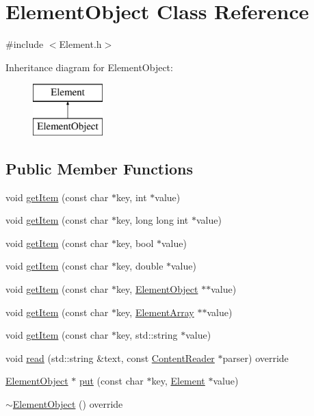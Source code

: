 \hypertarget{classElementObject}{}\section{Element\+Object Class Reference}
\label{classElementObject}


{\ttfamily \#include $<$Element.\+h$>$}

Inheritance diagram for Element\+Object\+:\begin{figure}[H]
\begin{center}
\leavevmode
\includegraphics[height=2.000000cm]{classElementObject}
\end{center}
\end{figure}
\subsection*{Public Member Functions}
\begin{DoxyCompactItemize}
\item 
void \mbox{\hyperlink{classElementObject_a7b3a1ef505e63d87ad39309c5ae1b5b3}{get\+Item}} (const char $\ast$key, int $\ast$value)
\item 
void \mbox{\hyperlink{classElementObject_af0ed1f4a16e995e2f66707d3375f7f39}{get\+Item}} (const char $\ast$key, long long int $\ast$value)
\item 
void \mbox{\hyperlink{classElementObject_a78d2c73282624ffed8607d2b8adc3435}{get\+Item}} (const char $\ast$key, bool $\ast$value)
\item 
void \mbox{\hyperlink{classElementObject_a114eb87b32efc8c71c3b14bfc9d121ce}{get\+Item}} (const char $\ast$key, double $\ast$value)
\item 
void \mbox{\hyperlink{classElementObject_a83b8a7f1230171e12f8f3a12326f32a2}{get\+Item}} (const char $\ast$key, \mbox{\hyperlink{classElementObject}{Element\+Object}} $\ast$$\ast$value)
\item 
void \mbox{\hyperlink{classElementObject_adf210b43e30ae63d08c05eb7a46b8c44}{get\+Item}} (const char $\ast$key, \mbox{\hyperlink{classElementArray}{Element\+Array}} $\ast$$\ast$value)
\item 
void \mbox{\hyperlink{classElementObject_a654bd0874175b07f4efa368f97dd82fa}{get\+Item}} (const char $\ast$key, std\+::string $\ast$value)
\item 
void \mbox{\hyperlink{classElementObject_a2217d9754771964af5e590a5fabe2c4e}{read}} (std\+::string \&text, const \mbox{\hyperlink{classContentReader}{Content\+Reader}} $\ast$parser) override
\item 
\mbox{\hyperlink{classElementObject}{Element\+Object}} $\ast$ \mbox{\hyperlink{classElementObject_ab9dd82037b752ab2e6f4e3de53348483}{put}} (const char $\ast$key, \mbox{\hyperlink{classElement}{Element}} $\ast$value)
\item 
\mbox{\hyperlink{classElementObject_a4bec4155f2f99e6ec30e3d44a4d84fa4}{$\sim$\+Element\+Object}} () override
\end{DoxyCompactItemize}
